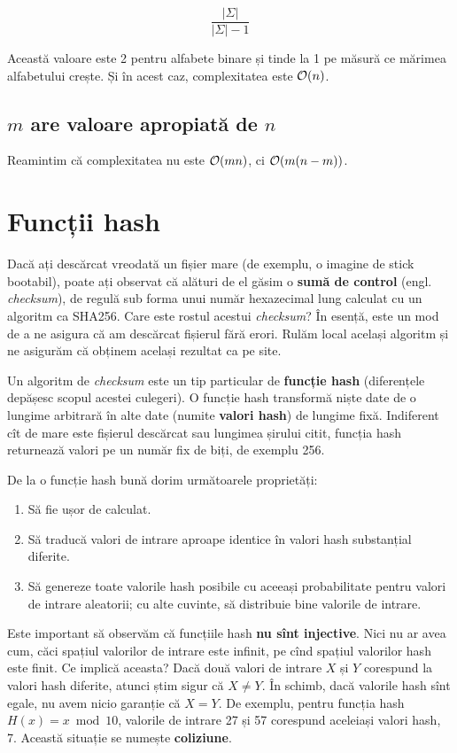 \documentclass[../main.tex]{subfiles}
\begin{document}
$$\frac{|\Sigma|}{|\Sigma| - 1}$$

Această valoare este 2 pentru alfabete binare și tinde la 1 pe măsură ce mărimea alfabetului crește. Și în acest caz, complexitatea este $\mathcal{O}(n)$.


\subsection{\texorpdfstring{$m$}{m} are valoare apropiată de \texorpdfstring{$n$}{n}}

Reamintim că complexitatea nu este $\mathcal{O}(mn)$, ci $\mathcal{O}(m(n-m))$.


\section{Funcții hash}

Dacă ați descărcat vreodată un fișier mare (de exemplu, o imagine de stick bootabil), poate ați observat că alături de el găsim o \textbf{sumă de control} (engl. \textit{checksum}), de regulă sub forma unui număr hexazecimal lung calculat cu un algoritm ca SHA256. Care este rostul acestui \textit{checksum}? În esență, este un mod de a ne asigura că am descărcat fișierul fără erori. Rulăm local același algoritm și ne asigurăm că obținem același rezultat ca pe site.

Un algoritm de \textit{checksum} este un tip particular de \textbf{funcție hash} (diferențele depășesc scopul acestei culegeri). O funcție hash transformă niște date de o lungime arbitrară în alte date (numite \textbf{valori hash}) de lungime fixă. Indiferent cît de mare este fișierul descărcat sau lungimea șirului citit, funcția hash returnează valori pe un număr fix de biți, de exemplu 256.

De la o funcție hash bună dorim următoarele proprietăți:

\begin{enumerate}
  \item Să fie ușor de calculat.
  \item Să traducă valori de intrare aproape identice în valori hash substanțial diferite.
  \item Să genereze toate valorile hash posibile cu aceeași probabilitate pentru valori de intrare aleatorii; cu alte cuvinte, să distribuie bine valorile de intrare.
\end{enumerate}

Este important să observăm că funcțiile hash \textbf{nu sînt injective}. Nici nu ar avea cum, căci spațiul valorilor de intrare este infinit, pe cînd spațiul valorilor hash este finit. Ce implică aceasta? Dacă două valori de intrare $X$ și $Y$ corespund la valori hash diferite, atunci știm sigur că $X \neq Y$. În schimb, dacă valorile hash sînt egale, nu avem nicio garanție că $X = Y$. De exemplu, pentru funcția hash $H(x) = x \bmod 10$, valorile de intrare 27 și 57 corespund aceleiași valori hash, 7. Această situație se numește \textbf{coliziune}.
\end{document}

